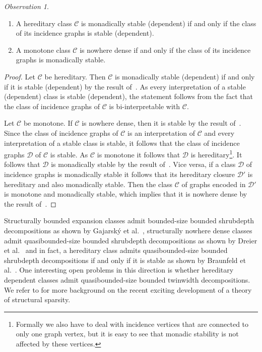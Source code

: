\documentclass[1p,number,a4paper]{elsarticle}
\theoremstyle{remark}
\newcommand{\Cc}{\mathscr{C}}
\newcommand{\Dd}{\mathscr{D}}
\newtheorem{observation}[theorem]{Observation}
\begin{document}
\begin{observation}
    \mbox{}
    \begin{enumerate}
        \item A hereditary class $\Cc$ is monadically stable (dependent) if and only if the class of its incidence graphs is stable (dependent). 
        \item A monotone class $\Cc$ is nowhere dense if and only if the class of its incidence graphs is monadically stable. 
    \end{enumerate}
\end{observation}

\begin{proof}
    Let $\Cc$ be hereditary. Then $\Cc$ is monadically stable (dependent) if and only if it is stable (dependent) by the result of~\cite{braunfeld2021characterizations}. 
    As every interpretation of a stable (dependent) class is stable (dependent), the statement follows from the fact that the class of incidence graphs of $\Cc$ is bi-interpretable with $\Cc$. 

    Let $\Cc$ be monotone. 
    If $\Cc$ is nowhere dense, then it is stable by the result of~\cite{adler2014interpreting}. 
    Since the class of incidence graphs of $\Cc$ is an interpretation of $\Cc$ and every interpretation of a stable class is stable, it follows that the class of incidence graphs $\Dd$ of $\Cc$ is stable. 
    As $\Cc$ is monotone it follows that $\Dd$ is hereditary\footnote{Formally we also have to deal with incidence vertices that are connected to only one graph vertex, but it is easy to see that monadic stability is not affected by these vertices.}. It follows that $\Dd$ is monadically stable by the result of~\cite{braunfeld2021characterizations}. 
    Vice versa, if a class $\Dd$ of incidence graphs is monadically stable it follows that its hereditary closure $\Dd'$ is hereditary and also monadically stable. 
    Then the class $\Cc$ of graphs encoded in $\Dd'$ is monotone and monadically stable, which implies that it is nowhere dense by the result of~\cite{adler2014interpreting}. 
\end{proof}
 
Structurally bounded expansion classes admit bounded-size bounded shrubdepth decompositions as shown by Gajarsk{\'y} et al.~\cite{gajarsky2020first}, structurally nowhere dense classes admit quasibounded-size bounded shrubdepth decompositions as shown by Dreier et al.~\cite{dreier2022treelike} and in fact, a hereditary class admits quasibounded-size bounded shrubdepth decompositions if and only if it is stable as shown by Braunfeld et al.~\cite{braunfeld2024decomposition}. %
One interesting open problems in this direction is whether hereditary dependent classes admit quasibounded-size bounded twinwidth decompositions. 
We refer to \cite{bonnet2022model,braunfeld2022decomposition,dreier2023first,dreier2022treelike,DreierMST23,dreier2024flip,gajarsky2020new,gajarsky2020first,gajarsky2023flipper,gajarsky2024classes,nevsetvril2020linear,nevsetvril2021rankwidth,ohlmann2023canonical,torunczyk2023flip} for more background on the recent exciting development of a theory of structural sparsity. 
\end{document}
